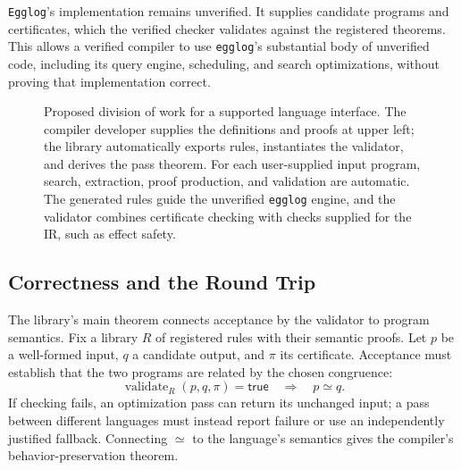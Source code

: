 \texttt{Egglog}'s implementation remains unverified.
It supplies candidate programs and certificates, which the verified checker validates
  against the registered theorems.
This allows a verified compiler to use \texttt{egglog}'s substantial body of unverified code,
  including its query engine, scheduling, and search optimizations,
  without proving that implementation correct.

\begin{figure}[htbp]
  \centering
  
  \caption{Proposed division of work for a supported language interface.
    The compiler developer supplies the definitions and proofs at upper left;
    the library automatically exports rules, instantiates the validator,
    and derives the pass theorem.
    For each user-supplied input program, search, extraction, proof production,
    and validation are automatic.
    The generated rules guide the unverified \texttt{egglog} engine,
    and the validator combines certificate checking with checks supplied for the IR,
    such as effect safety.}
  \label{fig:verified-compilation-pipeline}
\end{figure}

\subsection{Correctness and the Round Trip}
\label{sec:verified-round-trip}

The library's main theorem connects acceptance by the validator to program semantics.
Fix a library $R$ of registered rules with their semantic proofs.
Let $p$ be a well-formed input, $q$ a candidate output, and $\pi$ its certificate.
Acceptance must establish that the two programs are related by the chosen congruence:
\begin{equation}
  \operatorname{validate}_{R}(p,q,\pi)=\mathsf{true}
  \quad\Longrightarrow\quad
  p\simeq q.
  \label{eq:validator-soundness}
\end{equation}
If checking fails, an optimization pass can return its unchanged input;
  a pass between different languages must instead report failure or use an independently justified fallback.
Connecting $\simeq$ to the language's semantics gives the compiler's behavior-preservation theorem.

